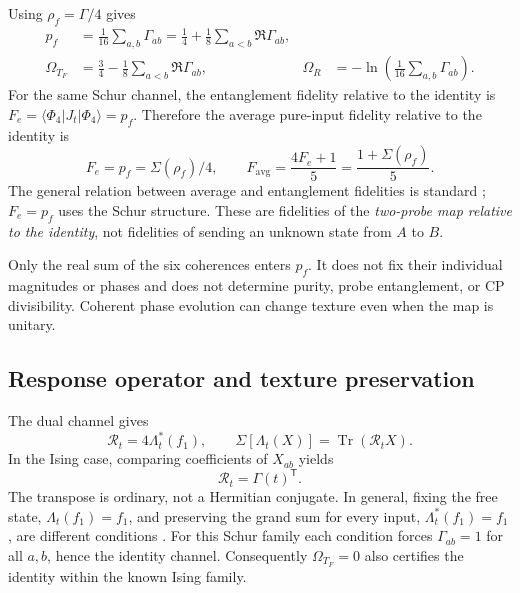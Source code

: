 \documentclass[11pt,a4paper]{article}
\newcommand{\ket}[1]{\lvert #1\rangle}
\newcommand{\bra}[1]{\langle #1\rvert}
\newcommand{\Tr}{\operatorname{Tr}}
\newcommand{\OmF}{\Omega_{T_F}}
\newcommand{\OmR}{\Omega_R}
\begin{document}
Using $\rho_f=\Gamma/4$ gives
\begin{align}
 p_f&=\frac1{16}\sum_{a,b}\Gamma_{ab}
     =\frac14+\frac18\sum_{a<b}\Re\Gamma_{ab},\\
 \OmF&=\frac34-\frac18\sum_{a<b}\Re\Gamma_{ab},
 &\OmR&=-\ln\!\left(\frac1{16}\sum_{a,b}\Gamma_{ab}\right).
 \label{eq:omegazz}
\end{align}
For the same Schur channel, the entanglement fidelity relative to the
identity is $F_e=\bra{\Phi_4}J_t\ket{\Phi_4}=p_f$. Therefore the
average pure-input fidelity relative to the identity is
\begin{equation}
 \boxed{F_e=p_f=\Sigma(\rho_f)/4,\qquad
 F_{\mathrm{avg}}=\frac{4F_e+1}{5}
                 =\frac{1+\Sigma(\rho_f)}5.}
 \label{eq:fidelities}
\end{equation}
The general relation between average and entanglement fidelities is
standard \cite{Nielsen2002}; $F_e=p_f$ uses the Schur structure.
These are fidelities of the \emph{two-probe map relative to the identity},
not fidelities of sending an unknown state from $A$ to $B$.

Only the real sum of the six coherences enters $p_f$. It does not fix
their individual magnitudes or phases and does not determine purity,
probe entanglement, or CP divisibility. Coherent phase evolution can
change texture even when the map is unitary.

\subsection{Response operator and texture preservation}

The dual channel gives
\begin{equation}
 \mathcal R_t=4\Lambda_t^*(f_1),\qquad
 \Sigma[\Lambda_t(X)]=\Tr(\mathcal R_tX).
 \label{eq:response}
\end{equation}
In the Ising case, comparing coefficients of $X_{ab}$ yields
\begin{equation}
 \mathcal R_t=\Gamma(t)^{\mathsf T}.
 \label{eq:responsetranspose}
\end{equation}
The transpose is ordinary, not a Hermitian conjugate. In general,
fixing the free state, $\Lambda_t(f_1)=f_1$, and preserving the grand
sum for every input, $\Lambda_t^*(f_1)=f_1$, are different conditions
\cite{Vieira2026}. For this Schur family each condition forces
$\Gamma_{ab}=1$ for all $a,b$, hence the identity channel. Consequently
$\OmF=0$ also certifies the identity within the known Ising family.
\end{document}
